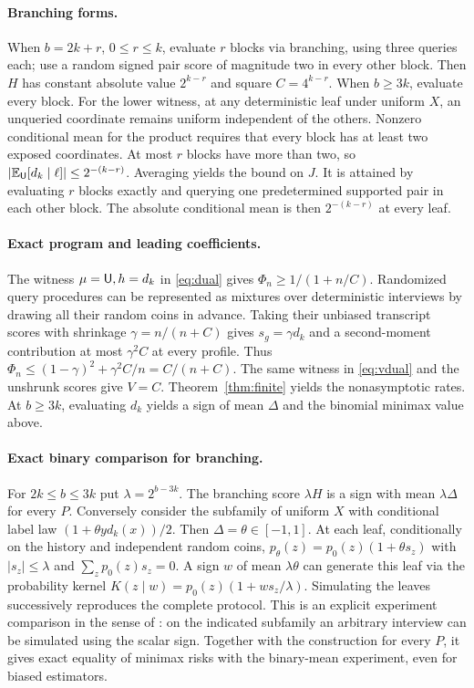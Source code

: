 \paragraph{Branching forms.}
When $b=2k+r$, $0\le r\le k$, evaluate $r$ blocks via branching, using three queries each; use a random signed pair score of magnitude two in every other block. Then $H$ has constant absolute value $2^{k-r}$ and square $C=4^{k-r}$. When $b\ge3k$, evaluate every block. For the lower witness, at any deterministic leaf under uniform $X$, an unqueried coordinate remains uniform independent of the others. Nonzero conditional mean for the product requires that every block has at least two exposed coordinates. At most $r$ blocks have more than two, so $|\mathbb{E}_\mathsf U[d_k\mid\ell]|\le2^{-(k-r)}$. Averaging yields the bound on $J$. It is attained by evaluating $r$ blocks exactly and querying one predetermined supported pair in each other block. The absolute conditional mean is then $2^{-(k-r)}$ at every leaf.

\paragraph{Exact program and leading coefficients.}
The witness $\mu=\mathsf U,h=d_k$ in \eqref{eq:dual} gives $\Phi_n\ge1/(1+n/C)$. Randomized query procedures can be represented as mixtures over deterministic interviews by drawing all their random coins in advance. Taking their unbiased transcript scores with shrinkage $\gamma=n/(n+C)$ gives $s_g=\gamma d_k$ and a second-moment contribution at most $\gamma^2 C$ at every profile. Thus $\Phi_n\le(1-\gamma)^2+\gamma^2 C/n=C/(n+C)$. The same witness in \eqref{eq:vdual} and the unshrunk scores give $V=C$. Theorem~\ref{thm:finite} yields the nonasymptotic rates. At $b\ge3k$, evaluating $d_k$ yields a sign of mean $\Delta$ and the binomial minimax value above.

\paragraph{Exact binary comparison for branching.}
For $2k\le b\le3k$ put $\lambda=2^{b-3k}$. The branching score $\lambda H$ is a sign with mean $\lambda\Delta$ for every $P$. Conversely consider the subfamily of uniform $X$ with conditional label law $(1+\theta y d_k(x))/2$. Then $\Delta=\theta\in[-1,1]$. At each leaf, conditionally on the history and independent random coins, $p_\theta(z)=p_0(z)(1+\theta s_z)$ with $|s_z|\le\lambda$ and $\sum_zp_0(z)s_z=0$. A sign $w$ of mean $\lambda\theta$ can generate this leaf via the probability kernel $K(z\mid w)=p_0(z)(1+w s_z/\lambda)$. Simulating the leaves successively reproduces the complete protocol. This is an explicit experiment comparison in the sense of \citet{blackwell1953}: on the indicated subfamily an arbitrary interview can be simulated using the scalar sign. Together with the construction for every $P$, it gives exact equality of minimax risks with the binary-mean experiment, even for biased estimators.

